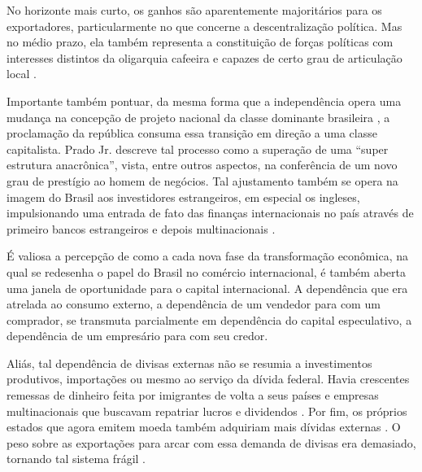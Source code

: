 No horizonte mais curto, os ganhos são aparentemente majoritários para
os exportadores, particularmente no que concerne a descentralização política. Mas no médio
prazo, ela também representa a constituição de forças políticas com
interesses distintos da oligarquia cafeeira e capazes de certo grau de
articulação local
\citep{furtado2005}.

Importante também pontuar, da mesma forma que a independência opera uma
mudança na concepção de projeto
nacional da classe dominante brasileira \citep{fernandes2020}, a proclamação da
república consuma essa transição em direção a uma classe capitalista.
Prado Jr. \citep{pradojunior2012} descreve tal processo como a superação de uma ``super
estrutura anacrônica'', vista, entre outros aspectos, na conferência de um novo
grau de prestígio ao homem de negócios. Tal ajustamento também se opera
na imagem do Brasil aos investidores estrangeiros, em especial os
ingleses, impulsionando uma entrada de fato das finanças internacionais
no país através de primeiro bancos estrangeiros e depois multinacionais
\citep{pradojunior2012}.

É valiosa a percepção de como a cada nova fase da transformação
econômica, na qual se redesenha o papel do Brasil no comércio
internacional, é também aberta uma janela de oportunidade para o capital
internacional. A dependência que era atrelada ao consumo externo, a
dependência de um vendedor para com um comprador, se transmuta
parcialmente em dependência do capital especulativo, a dependência de
um empresário para com seu credor.


Aliás, tal dependência de divisas externas não se resumia a
investimentos produtivos, importações ou mesmo ao serviço da dívida
federal. Havia crescentes remessas de dinheiro feita por imigrantes de
volta a seus países e empresas multinacionais que buscavam repatriar
lucros e dividendos
\citep{pradojunior2012}.
Por fim, os próprios estados que agora emitem moeda também adquiriam
mais dívidas externas
\citep{pradojunior2012}.
O peso sobre as exportações para arcar com essa demanda de divisas era
demasiado, tornando tal sistema frágil
\citep{pradojunior2012}.

